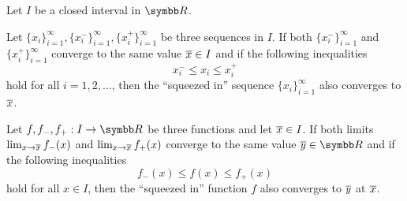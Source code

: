 \begin{lemma}\label{thm:squeeze_lemma}
  Let \( I \) be a closed interval in \( \BR \).

  \begin{lemenum}
     Let \( \{ x_i \}_{i=1}^\infty, \{ x_i^- \}_{i=1}^\infty, \{ x_i^+ \}_{i=1}^\infty \) be three sequences in \( I \). If both \( \{ x_i^- \}_{i=1}^\infty \) and \( \{ x_i^+ \}_{i=1}^\infty \) converge to the same value \( \overline{x} \in I \) and if the following inequalities
    \begin{equation*}
      x_i^- \leq x_i \leq x_i^+
    \end{equation*}
    hold for all \( i = 1, 2, \ldots \), then the \enquote{squeezed in} sequence \( \{ x_i \}_{i=1}^\infty \) also converges to \( \overline{x} \).

     Let \( f, f_-, f_+: I \to \BR \) be three functions and let \( \overline{x} \in I \). If both limits \( \lim_{x \to \overline{x}} f_-(x) \) and \( \lim_{x \to \overline{x}} f_+(x) \) converge to the same value \( \Ol y \in \BR \) and if the following inequalities
    \begin{equation*}
      f_-(x) \leq f(x) \leq f_+(x)
    \end{equation*}
    hold for all \( x \in I \), then the \enquote{squeezed in} function \( f \) also converges to \( \overline{y} \) at \( \overline{x} \).
  \end{lemenum}
\end{lemma}
